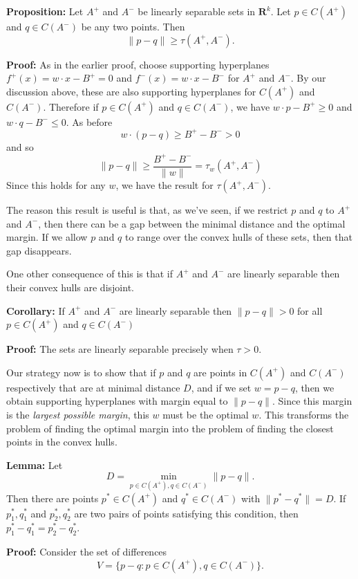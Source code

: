 \documentclass[
  oneside]{scrbook}
\begin{document}
\textbf{Proposition:} Let \(A^{+}\) and \(A^{-}\) be linearly separable
sets in \(\mathbf{R}^{k}\). Let \(p\in C(A^{+})\) and \(q\in C(A^{-})\)
be any two points. Then \[
\|p-q\|\ge \tau(A^{+},A^{-}).
\]

\textbf{Proof:} As in the earlier proof, choose supporting hyperplanes
\(f^{+}(x)=w\cdot x-B^{+}=0\) and \(f^{-}(x)=w\cdot x-B^{-}\) for
\(A^{+}\) and \(A^{-}\). By our discussion above, these are also
supporting hyperplanes for \(C(A^{+})\) and \(C(A^{-})\). Therefore if
\(p\in C(A^{+})\) and \(q\in C(A^{-})\), we have \(w\cdot p-B^{+}\ge 0\)
and \(w\cdot q-B^{-}\le 0\). As before \[
w\cdot(p-q)\ge B^{+}-B^{-}>0
\] and so \[
\|p-q\|\ge\frac{B^{+}-B^{-}}{\|w\|}=\tau_{w}(A^{+},A^{-})
\] Since this holds for any \(w\), we have the result for
\(\tau(A^{+},A^{-})\).

The reason this result is useful is that, as we've seen, if we restrict
\(p\) and \(q\) to \(A^{+}\) and \(A^{-}\), then there can be a gap
between the minimal distance and the optimal margin. If we allow \(p\)
and \(q\) to range over the convex hulls of these sets, then that gap
disappears.

One other consequence of this is that if \(A^{+}\) and \(A^{-}\) are
linearly separable then their convex hulls are disjoint.

\textbf{Corollary:} If \(A^{+}\) and \(A^{-}\) are linearly separable
then \(\|p-q\|>0\) for all \(p\in C(A^{+})\) and \(q\in C(A^{-})\)

\textbf{Proof:} The sets are linearly separable precisely when
\(\tau>0\).

Our strategy now is to show that if \(p\) and \(q\) are points in
\(C(A^{+})\) and \(C(A^{-})\) respectively that are at minimal distance
\(D\), and if we set \(w=p-q\), then we obtain supporting hyperplanes
with margin equal to \(\|p-q\|\). Since this margin is the \emph{largest
possible margin}, this \(w\) must be the optimal \(w\). This transforms
the problem of finding the optimal margin into the problem of finding
the closest points in the convex hulls.

\textbf{Lemma:} Let \[
D=\min_{p\in C(A^{+}),q\in C(A^{-})} \|p-q\|.
\] Then there are points \(p^*\in C(A^{+})\) and \(q^{*}\in C(A^{-})\)
with \(\|p^{*}-q^{*}\|=D\). If \(p_1^{*},q_1^{*}\) and
\(p_2^{*},q_2^{*}\) are two pairs of points satisfying this condition,
then \(p_1^{*}-q_1^{*}=p_2^{*}-q_{2}^{*}\).

\textbf{Proof:} Consider the set of differences \[
V = \{p-q: p\in C(A^{+}),q\in C(A^{-})\}.
\]
\end{document}
